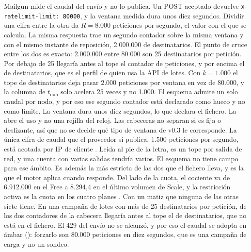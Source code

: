 Mailgun mide el caudal del envío y no lo publica.
Un POST aceptado devuelve \texttt{x-ratelimit-limit: 80000}, y la ventana medida dura unos diez segundos. Dividir una cifra entre la otra da $R = 8.000$ peticiones por segundo, el valor con el que se calcula.
La misma respuesta trae un segundo contador sobre la misma ventana y con el mismo instante de reposición, 2.000.000 de destinatarios.
El punto de cruce entre los dos es exacto: 2.000.000 entre 80.000 son 25 destinatarios por petición.
Por debajo de 25 llegaría antes al tope el contador de peticiones, y por encima el de destinatarios, que es el perfil de quien usa la API de lotes.
Con $k = 1.000$ el tope de destinatarios deja pasar 2.000 peticiones por ventana en vez de 80.000, y la columna de $t_{\min}$ solo acelera 25 veces y no 1.000.
El esquema admite un solo caudal por nodo, y por eso ese segundo contador está declarado como hueco y no como límite.
La ventana dura unos diez segundos, lo que declara el fichero. La abre el uso y no una rejilla del reloj.
Las cabeceras no separan si es fija o deslizante, así que no se decide qué tipo de ventana de v0.3 le corresponde.
La única cifra de caudal que el proveedor sí publica, 1.500 peticiones por segundo, está acotada por IP de cliente \citep{mailgundocs}.
Leída al pie de la letra, es un tope por salida de red, y una cuenta con varias salidas tendría varios. El esquema no tiene campo para ese ámbito.
Es además la más estricta de las dos que el fichero lleva, y es la que el motor aplica cuando responde.
Del lado de la cuota, el cociente va de 6.912.000 en el Free a 8.294,4 en el último volumen de Scale, y la restricción activa es la cuota en los cuatro planes \citep{mailgunpricing}.
Con un matiz que ninguna de las otras siete tiene.
En una campaña de lotes con más de 25 destinatarios por petición, de los dos contadores de la cabecera llegaría antes al tope el de destinatarios, que no está en el fichero.
El 429 del envío no se alcanzó, y por eso el caudal se adopta en ámbar (\semambar{}): forzarlo son 80.000 peticiones en diez segundos, que es una campaña de carga y no un sondeo.

